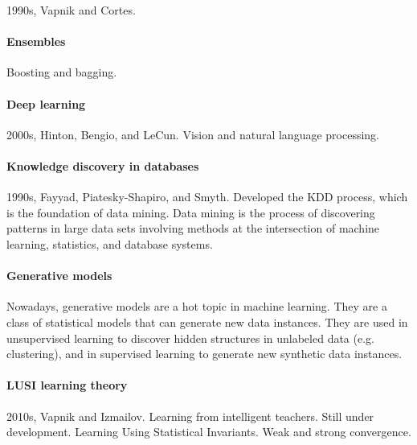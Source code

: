 1990s, Vapnik and Cortes.

\paragraph{Ensembles}

Boosting and bagging.

\paragraph{Deep learning}

2000s, Hinton, Bengio, and LeCun.
Vision and natural language processing.

\paragraph{Knowledge discovery in databases}

1990s, Fayyad, Piatesky-Shapiro, and Smyth.
Developed the KDD process, which is the foundation of data mining.
Data mining is the process of discovering patterns in large data sets involving methods at
the intersection of machine learning, statistics, and database systems.

\paragraph{Generative models}

Nowadays, generative models are a hot topic in machine learning.
They are a class of statistical models that can generate new data instances.
They are used in unsupervised learning to discover hidden structures in unlabeled data
(e.g. clustering), and in supervised learning to generate new synthetic data instances.

\paragraph{LUSI learning theory}

2010s, Vapnik and Izmailov.
Learning from intelligent teachers.  Still under development.
Learning Using Statistical Invariants.
Weak and strong convergence.
